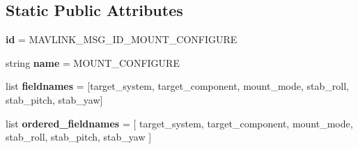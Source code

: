 \subsection*{Static Public Attributes}
\begin{DoxyCompactItemize}
\item 
\mbox{\label{classpymavlink_1_1dialects_1_1v10_1_1MAVLink__mount__configure__message_a8710de49c06186372fae4f446d64d43f}} 
{\bfseries id} = M\+A\+V\+L\+I\+N\+K\+\_\+\+M\+S\+G\+\_\+\+I\+D\+\_\+\+M\+O\+U\+N\+T\+\_\+\+C\+O\+N\+F\+I\+G\+U\+RE
\item 
\mbox{\label{classpymavlink_1_1dialects_1_1v10_1_1MAVLink__mount__configure__message_a80b4b2ed8a145f4bb1cc671b53613417}} 
string {\bfseries name} = \textquotesingle{}M\+O\+U\+N\+T\+\_\+\+C\+O\+N\+F\+I\+G\+U\+RE\textquotesingle{}
\item 
\mbox{\label{classpymavlink_1_1dialects_1_1v10_1_1MAVLink__mount__configure__message_a91139ae87bb094ea2486af481253bbcd}} 
list {\bfseries fieldnames} = \mbox{[}\textquotesingle{}target\+\_\+system\textquotesingle{}, \textquotesingle{}target\+\_\+component\textquotesingle{}, \textquotesingle{}mount\+\_\+mode\textquotesingle{}, \textquotesingle{}stab\+\_\+roll\textquotesingle{}, \textquotesingle{}stab\+\_\+pitch\textquotesingle{}, \textquotesingle{}stab\+\_\+yaw\textquotesingle{}\mbox{]}
\item 
\mbox{\label{classpymavlink_1_1dialects_1_1v10_1_1MAVLink__mount__configure__message_a4c35341886cf0f2b6e0e32d5afe4ed8d}} 
list {\bfseries ordered\+\_\+fieldnames} = \mbox{[} \textquotesingle{}target\+\_\+system\textquotesingle{}, \textquotesingle{}target\+\_\+component\textquotesingle{}, \textquotesingle{}mount\+\_\+mode\textquotesingle{}, \textquotesingle{}stab\+\_\+roll\textquotesingle{}, \textquotesingle{}stab\+\_\+pitch\textquotesingle{}, \textquotesingle{}stab\+\_\+yaw\textquotesingle{} \mbox{]}
\item 
\mbox{\label{classpymavlink_1_1dialects_1_1v10_1_1MAVLink__mount__configure__message_a1dd760417e0bb80b87a53c0fe2c6b150}} 

\end{DoxyCompactItemize}
